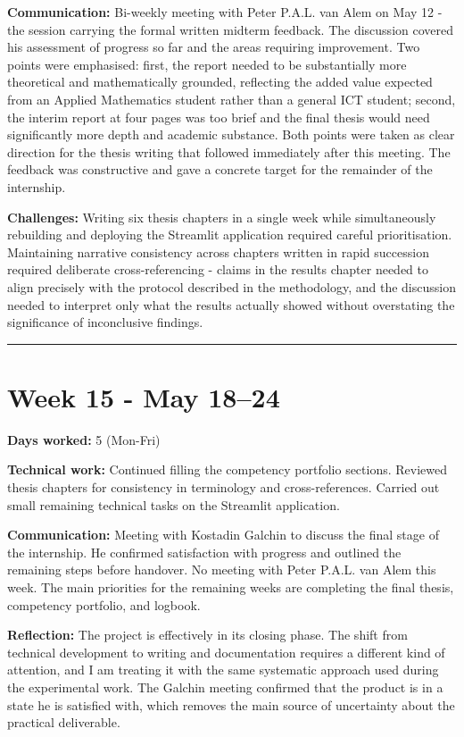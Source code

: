\documentclass[11pt,a4paper]{article}
\begin{document}
\textbf{Communication:} Bi-weekly meeting with Peter P.A.L. van Alem on May 12  -  the session carrying the formal written midterm feedback. The discussion covered his assessment of progress so far and the areas requiring improvement. Two points were emphasised: first, the report needed to be substantially more theoretical and mathematically grounded, reflecting the added value expected from an Applied Mathematics student rather than a general ICT student; second, the interim report at four pages was too brief and the final thesis would need significantly more depth and academic substance. Both points were taken as clear direction for the thesis writing that followed immediately after this meeting. The feedback was constructive and gave a concrete target for the remainder of the internship.

\textbf{Challenges:} Writing six thesis chapters in a single week while simultaneously rebuilding and deploying the Streamlit application required careful prioritisation. Maintaining narrative consistency across chapters written in rapid succession required deliberate cross-referencing  -  claims in the results chapter needed to align precisely with the protocol described in the methodology, and the discussion needed to interpret only what the results actually showed without overstating the significance of inconclusive findings.
\noindent\rule{\textwidth}{0.4pt}


\section{Week 15  -  May 18–24}

\textbf{Days worked:} 5 (Mon-Fri)

\textbf{Technical work:} Continued filling the competency portfolio sections. Reviewed thesis chapters for consistency in terminology and cross-references. Carried out small remaining technical tasks on the Streamlit application.

\textbf{Communication:} Meeting with Kostadin Galchin to discuss the final stage of the internship. He confirmed satisfaction with progress and outlined the remaining steps before handover. No meeting with Peter P.A.L. van Alem this week. The main priorities for the remaining weeks are completing the final thesis, competency portfolio, and logbook.

\textbf{Reflection:} The project is effectively in its closing phase. The shift from technical development to writing and documentation requires a different kind of attention, and I am treating it with the same systematic approach used during the experimental work. The Galchin meeting confirmed that the product is in a state he is satisfied with, which removes the main source of uncertainty about the practical deliverable.
\end{document}
